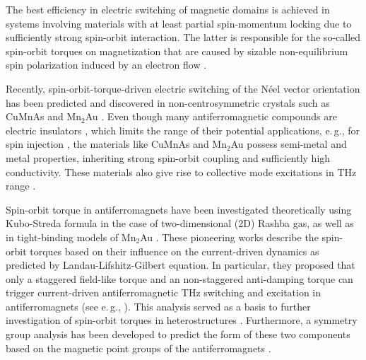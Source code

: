 The best efficiency in electric switching of magnetic domains is achieved in systems involving materials with at least partial spin-momentum locking \cite{fina_electric_2017} due to sufficiently strong spin-orbit interaction. The latter is responsible for the so-called spin-orbit torques on magnetization that are caused by sizable non-equilibrium spin polarization induced by an electron flow \cite{brataas_current-induced_2012, hals_phenomenology_2013, zelezny_relativistic_2014, freimuth_spin-orbit_2014, ghosh_spin-orbit_2017, smejkal_electric_2017, zelezny_spin_2018, zhou_strong_2018, manchon_current-induced_2019, moriyama_spin-orbit-torque_2018, li_manipulation_2019, chen_electric_2019, zhou_large_2019, zhou_fieldlike_2019, bodnar_writing_2018}.  

Recently, spin-orbit-torque-driven electric switching of the N\'eel vector orientation has been predicted \cite{zelezny_relativistic_2014} and discovered in non-centrosymmetric crystals such as CuMnAs \cite{wadley_electrical_2016, fina_electric_2017, zelezny_spin_2018, saidl_optical_2017} and Mn$_2$Au \cite{barthem_revealing_2013, jourdan_epitaxial_2015, bhattacharjee_neel_2018}. Even though many antiferromagnetic compounds are electric insulators \cite{pandey_doping_2017}, which limits the range of their potential applications, e.\,g., for spin injection \cite{tshitoyan_electrical_2015}, the materials like CuMnAs and Mn$_2$Au possess  semi-metal and metal properties, inheriting strong spin-orbit coupling and sufficiently high conductivity. These materials also give rise to collective mode excitations in THz range \cite{bhattacharjee_neel_2018}. 

Spin-orbit torque in antiferromagnets have been investigated theoretically using Kubo-Streda formula in the case of two-dimensional (2D) Rashba gas, as well as in tight-binding models of Mn$_2$Au \cite{zelezny_relativistic_2014, zelezny_spin-orbit_2017}. These pioneering works describe the spin-orbit torques based on their influence on the current-driven dynamics as predicted by Landau-Lifshitz-Gilbert equation. In particular, they proposed that only a staggered field-like torque and an non-staggered anti-damping torque can trigger current-driven antiferromagnetic THz switching and excitation in antiferromagnets (see e.\,g., \cite{fjaerbu_electrically_2017, cheng_terahertz_2016, khymyn_antiferromagnetic_2017}). This analysis served as a basis to further investigation of spin-orbit torques in heterostructures \cite{manchon_spin_2017, ghosh_spin-orbit_2017, ghosh_nonequilibrium_2019}. Furthermore, a symmetry group analysis has been developed to predict the form of these two components based on the magnetic point groups of the antiferromagnets \cite{zelezny_spin-orbit_2017, watanabe_symmetry_2018}. 
 
